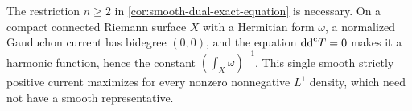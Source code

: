 The restriction $n\geq2$ in \cref{cor:smooth-dual-exact-equation} is necessary. On a compact connected Riemann surface $X$ with a Hermitian form $\omega$, a normalized Gauduchon current has bidegree $(0,0)$, and the equation $\mathrm{dd}^{\mathrm{c}} T=0$ makes it a harmonic function, hence the constant $(\int_X\omega)^{-1}$. This single smooth strictly positive current maximizes for every nonzero nonnegative $L^1$ density, which need not have a smooth representative.
